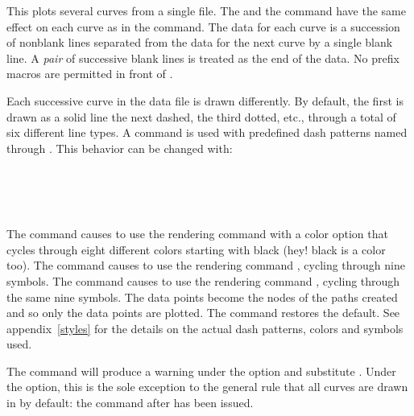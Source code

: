 \documentclass[letterpaper]{article}
\begin{document}
\begin{cd}
%
\end{cd}

This plots several curves from a single file. The  and the
command  have the same effect on each curve as in the
 command. The data for each curve is a succession of
nonblank lines separated from the data for the next curve by a single
blank line. A \emph{pair} of successive blank lines is treated as the
end of the data. No prefix macros are permitted in front of
.

Each successive curve in the data file is drawn differently. By default,
the first is drawn as a solid line the next dashed, the third dotted,
etc., through a total of six different line types. A 
command is used with predefined dash patterns named 
through . This behavior can be changed with:

\begin{cd}
\\
\\
\\
%
%
%
%
\end{cd}

The command  causes  to use the rendering
command  with a color option that cycles through eight
different colors starting with black (hey! black is a color too). The
command  causes  to use the rendering
command , cycling through nine symbols. The command
 causes  to use the rendering command
, cycling through the same nine symbols. The data points
become the nodes of the paths created and so only the data points are
plotted. The command  restores the default. See
appendix~\ref{styles} for the details on the actual dash patterns,
colors and symbols used.

The command  will produce a warning under the
 option and substitute . Under the
 option, this is the sole exception to the general rule
that all curves are drawn in  by default: the
 command after  has been issued.
\end{document}

